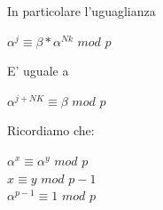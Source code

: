\documentclass[11pt, oneside]{article}   	%
\begin{document}
In particolare l'uguaglianza
\begin{center}
$\alpha^j \equiv \beta * \alpha^{Nk}$ $mod$ $p$
\end{center}
E' uguale a 
\begin{center}
$\alpha^{j+NK} \equiv \beta$ $mod$ $p$
\end{center}
Ricordiamo che:
\begin{center}
$\alpha^x \equiv \alpha^y$ $mod$ $p$\\
$x \equiv y$ $mod$ $p-1$\\
$\alpha^{p-1}\equiv 1$ $mod$ $p$
\end{center}

\long{}
\end{document}
